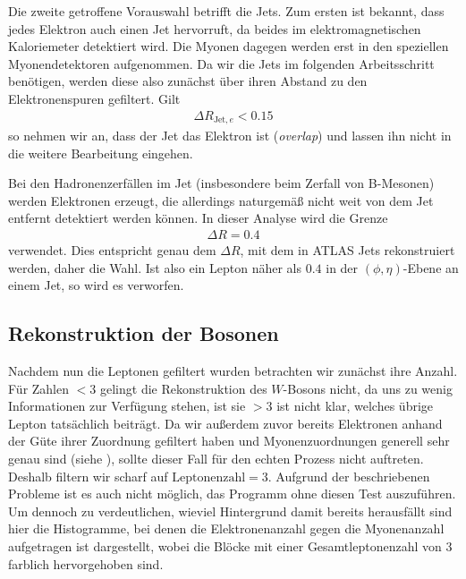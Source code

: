 
Die zweite getroffene Vorauswahl betrifft die Jets. Zum ersten ist bekannt, dass
jedes Elektron auch einen Jet hervorruft, da beides im elektromagnetischen
Kaloriemeter detektiert wird. Die Myonen dagegen werden erst in den speziellen
Myonendetektoren aufgenommen. Da wir die Jets im folgenden Arbeitsschritt
benötigen, werden diese also zunächst über ihren Abstand zu den Elektronenspuren
gefiltert. Gilt
\begin{align}
  \Delta R_{\text{Jet},e} < 0.15
\end{align}
so nehmen wir an, dass der Jet das Elektron ist (\emph{overlap}) und lassen ihn
nicht in die weitere Bearbeitung eingehen.

Bei den Hadronenzerfällen im Jet (insbesondere beim Zerfall von B-Mesonen)
werden Elektronen erzeugt, die allerdings naturgemäß nicht weit von dem Jet
entfernt detektiert werden können. In dieser Analyse wird die Grenze
\begin{align}
  \Delta R = 0.4
\end{align}
verwendet. Dies entspricht genau dem $\Delta R$, mit dem in ATLAS Jets
rekonstruiert werden\cite{jet-recon}, daher die Wahl. Ist also ein Lepton näher
als $0.4$ in der $(\phi, \eta)$-Ebene an einem Jet, so wird es verworfen.


\subsection{Rekonstruktion der Bosonen}
Nachdem nun die Leptonen gefiltert wurden betrachten wir zunächst ihre Anzahl.
Für Zahlen $< 3$ gelingt die Rekonstruktion des $W$-Bosons nicht, da uns zu
wenig Informationen zur Verfügung stehen, ist sie $> 3$ ist nicht klar, welches
übrige Lepton tatsächlich beiträgt. Da wir außerdem zuvor bereits Elektronen
anhand der Güte ihrer Zuordnung gefiltert haben und Myonenzuordnungen generell
sehr genau sind (siehe \cite{myon-zuordnung}), sollte dieser Fall für den echten
Prozess nicht auftreten. Deshalb filtern wir scharf auf $\text{Leptonenzahl} =
3$. Aufgrund der beschriebenen Probleme ist es auch nicht möglich, das Programm
ohne diesen Test auszuführen. Um dennoch zu verdeutlichen, wieviel Hintergrund
damit bereits herausfällt sind hier die Histogramme, bei denen die
Elektronenanzahl gegen die Myonenanzahl aufgetragen ist dargestellt, wobei die
Blöcke mit einer Gesamtleptonenzahl von 3 farblich hervorgehoben sind.

